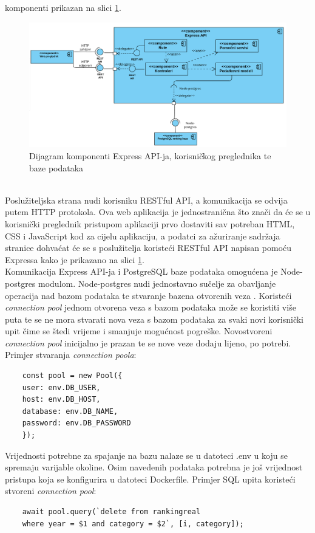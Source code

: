 \documentclass[times, utf8, zavrsni]{fer}
\begin{document}
komponenti prikazan na slici \ref{fig:expressdijagramkomponenti}.
\begin{figure}[htb]
    \hspace*{-2cm} 
       \includegraphics[scale=0.25]{expressdijagramkomponenti.png} 
       \caption{Dijagram komponenti Express API-ja, korisničkog preglednika te baze podataka}
       \label{fig:expressdijagramkomponenti}
       \end{figure} 
\\Poslužiteljska strana nudi korisniku RESTful API, a komunikacija se odvija putem HTTP protokola. Ova web aplikacija je jednostranična što znači da će se u korisnički preglednik
pristupom aplikaciji prvo dostaviti sav potreban HTML, CSS i JavaScript kod za cijelu aplikaciju, a podatci za ažuriranje sadržaja stranice 
dohvaćat će se s poslužitelja koristeći RESTful API napisan pomoću Expressa kako je prikazano na slici \ref{fig:expressdijagramkomponenti}. \\Komunikacija
Express API-ja i PostgreSQL baze podataka omogućena je Node-postgres modulom. Node-postgres nudi jednostavno sučelje za obavljanje operacija nad bazom podataka te stvaranje 
bazena otvorenih veza . Koristeći \emph{connection pool} jednom otvorena veza s bazom podataka može se koristiti više puta te se ne mora 
stvarati nova veza s bazom podataka za svaki novi korisnički upit čime se štedi vrijeme i smanjuje mogućnost pogreške. Novostvoreni \emph{connection pool} inicijalno 
je prazan te se nove veze dodaju lijeno, po potrebi.
\newpage Primjer stvaranja \emph{connection poola}:
\lstset{language=Java, tabsize=2}
\begin{lstlisting}
    const pool = new Pool({
    user: env.DB_USER,
    host: env.DB_HOST,
    database: env.DB_NAME,
    password: env.DB_PASSWORD
    });
\end{lstlisting}
Vrijednosti potrebne za spajanje na bazu nalaze se u datoteci .env u koju se spremaju varijable okoline. Osim navedenih podataka potrebna je još 
vrijednost pristupa  koja se konfigurira u datoteci Dockerfile.  
Primjer SQL upita koristeći stvoreni \emph{connection pool}:
\begin{lstlisting}
    await pool.query(`delete from rankingreal 
    where year = $1 and category = $2`, [i, category]);
\end{lstlisting}
\end{document}
